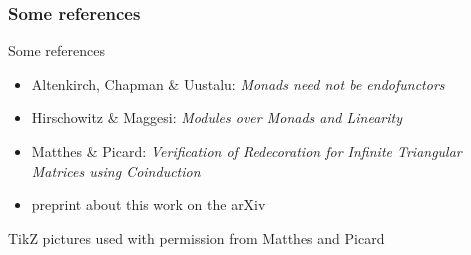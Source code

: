 \documentclass[
]
{beamer}
\begin{document}
\begin{frame}
 \frametitle{Some references}
 
  
  
  \begin{block}{Some references}
   \begin{itemize}
    \item Altenkirch, Chapman \& Uustalu: \emph{Monads need not be endofunctors}
    \item Hirschowitz \& Maggesi: \emph{Modules over Monads and Linearity}
    \item Matthes \& Picard: \emph{Verification of Redecoration for Infinite Triangular Matrices using Coinduction}
    \item preprint about this work on the arXiv
   \end{itemize}
  \end{block}

  TikZ pictures used with permission from Matthes and Picard
 
\end{frame}
\end{document}
